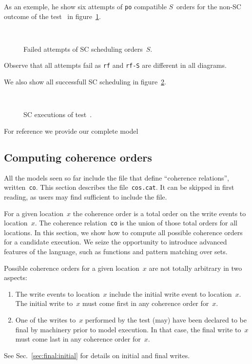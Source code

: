 As an exemple, he show six attempts of \texttt{po} compatible $S$~orders
for the non-SC outcome of the test~ in figure~\ref{sblamport}.
\begin{figure}[htp]
\caption{\label{sblamport}Failed attempts of SC scheduling orders~$S$.}
\begin{center}
\quad{}\quad{}\\
\quad{}\quad{}
\end{center}
\end{figure}
Observe that all attempts fail as \texttt{rf} and \texttt{rf-S}
are different in all diagrams.

We also show all successfull SC scheduling in figure~\ref{sbok}.
\begin{figure}[htp]
\caption{\label{sbok}SC executions of test~.}
\begin{center}
\quad{}\quad{}\\
\quad{}\quad{}
\end{center}
\end{figure}


For reference we provide our complete model~


\subsection{Computing \label{sec:cos}coherence orders}
All the models seen so far include the file  that define
``coherence relations'', written~\texttt{co}.
This section describes the file~\texttt{cos.cat}.
It can be skipped in first reading, as users may find sufficient
to include the file.

For a given location~$x$ the coherence order is a total order on the
write events to location~$x$. The coherence relation~\texttt{co} is the union
of those total orders for all locations.
In this section, we show how to compute all possible coherence orders for
a candidate execution.
We seize the opportunity to introduce advanced features of the \cat{}
language, such as functions and pattern matching over sets.

Possible coherence orders for a given location~$x$
are not totally arbitrary in two aspects:
\begin{enumerate}
\item The write events to location~$x$ include
the initial write event to location~$x$.  The initial write to~$x$ must come
first in any coherence order for~$x$.
\item One of the writes to~$x$ performed by the test (may) have been declared
to be final by \herd{} machinery prior to model execution.
In that case, the final write to~$x$ must come last in any coherence order
for~$x$.
\end{enumerate}
See Sec.~\ref{sec:final:initial} for details on initial and final writes.

